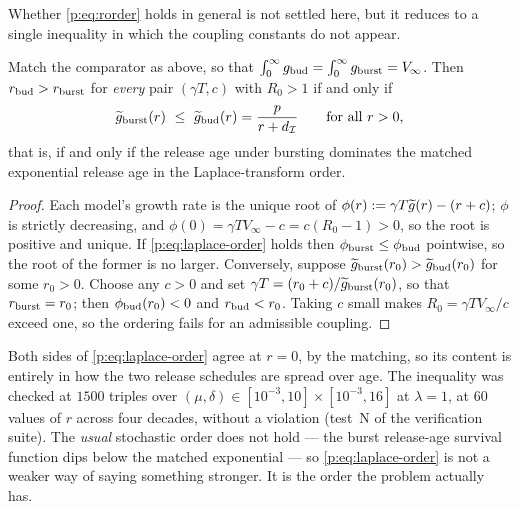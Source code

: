 Whether \cref{p:eq:rorder} holds in general is not settled here, but it
reduces to a single inequality in which the coupling constants do not appear.

\begin{proposition}
\label{p:prop:rorder}
Match the comparator as above, so that
$\int_0^\infty g_{\rm bud}=\int_0^\infty g_{\rm burst}=V_\infty$. Then
$r_{\rm bud}>r_{\rm burst}$ for \emph{every} pair $(\gamma T,c)$ with
$R_0>1$ if and only if
\begin{equation}
\Lap{g}_{\rm burst}(r)\ \le\ \Lap{g}_{\rm bud}(r)=\frac{p}{r+d_{\Icell}}
\qquad\text{for all }r>0,
\label{p:eq:laplace-order}
\end{equation}
that is, if and only if the release age under bursting dominates the matched
exponential release age in the Laplace-transform order.
\end{proposition}

\begin{proof}
Each model's growth rate is the unique root of
$\phi(r):=\gamma T\widetilde{g}(r)-(r+c)$; $\phi$ is strictly decreasing, and
$\phi(0)=\gamma TV_\infty-c=c(R_0-1)>0$, so the root is positive and unique.
If \cref{p:eq:laplace-order} holds then $\phi_{\rm burst}\le\phi_{\rm bud}$
pointwise, so the root of the former is no larger. Conversely, suppose
$\widetilde{g}_{\rm burst}(r_0)>\widetilde{g}_{\rm bud}(r_0)$ for some $r_0>0$. Choose any
$c>0$ and set $\gamma T=(r_0+c)/\widetilde{g}_{\rm burst}(r_0)$, so that
$r_{\rm burst}=r_0$; then $\phi_{\rm bud}(r_0)<0$ and $r_{\rm bud}<r_0$.
Taking $c$ small makes $R_0=\gamma TV_\infty/c$ exceed one, so the ordering
fails for an admissible coupling.
\end{proof}

\noindent
Both sides of \cref{p:eq:laplace-order} agree at $r=0$, by the matching, so
its content is entirely in how the two release schedules are spread over
age. The inequality was checked at $1500$ triples over
$(\mu,\delta)\in[10^{-3},10]\times[10^{-3},16]$ at $\lambda=1$, at $60$
values of $r$ across four decades, without a violation
(test~N of the verification suite). The \emph{usual} stochastic order does
not hold --- the burst release-age survival function dips below the matched
exponential --- so \cref{p:eq:laplace-order} is not a weaker way of saying
something stronger. It is the order the problem actually has.

